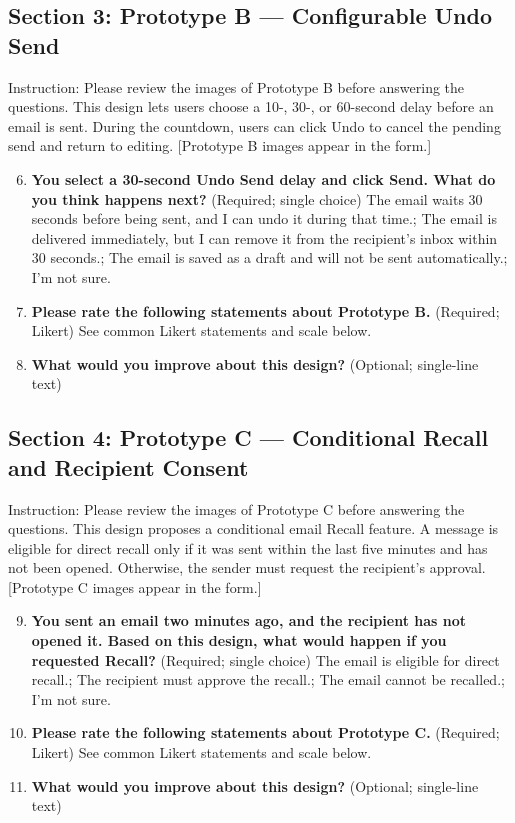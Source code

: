 \documentclass[letterpaper]{jdf}
\begin{document}
\subsection*{Section 3: Prototype B --- Configurable Undo Send}
Instruction: Please review the images of Prototype B before answering the questions. This design lets users choose a 10-, 30-, or 60-second delay before an email is sent. During the countdown, users can click Undo to cancel the pending send and return to editing. [Prototype B images appear in the form.]
\begin{enumerate}\setcounter{enumi}{5}
\item \textbf{You select a 30-second Undo Send delay and click Send. What do you think happens next?} (Required; single choice) The email waits 30 seconds before being sent, and I can undo it during that time.; The email is delivered immediately, but I can remove it from the recipient's inbox within 30 seconds.; The email is saved as a draft and will not be sent automatically.; I'm not sure.
\item \textbf{Please rate the following statements about Prototype B.} (Required; Likert) See common Likert statements and scale below.
\item \textbf{What would you improve about this design?} (Optional; single-line text)
\end{enumerate}
\subsection*{Section 4: Prototype C --- Conditional Recall and Recipient Consent}
Instruction: Please review the images of Prototype C before answering the questions. This design proposes a conditional email Recall feature. A message is eligible for direct recall only if it was sent within the last five minutes and has not been opened. Otherwise, the sender must request the recipient's approval. [Prototype C images appear in the form.]
\begin{enumerate}\setcounter{enumi}{8}
\item \textbf{You sent an email two minutes ago, and the recipient has not opened it. Based on this design, what would happen if you requested Recall?} (Required; single choice) The email is eligible for direct recall.; The recipient must approve the recall.; The email cannot be recalled.; I'm not sure.
\item \textbf{Please rate the following statements about Prototype C.} (Required; Likert) See common Likert statements and scale below.
\item \textbf{What would you improve about this design?} (Optional; single-line text)
\end{enumerate}
\end{document}
